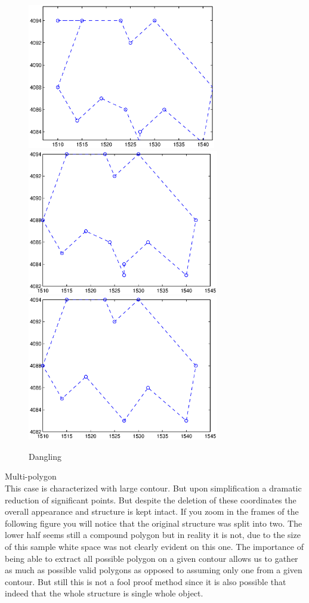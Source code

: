 \documentclass{sig-alternate}
\begin{document}
\begin{figure}
 \includegraphics[height=2.5in]{dangle_orig.eps}
 \includegraphics[height=2.5in]{dangle_dist0.eps}
 \includegraphics[height=2.5in]{dangle_dist2.eps}
 \caption{Dangling}

 \label{fig:Dangling}
\end{figure}

Multi-polygon \\

This case is characterized with large contour. But upon simplification a dramatic reduction of significant points. But despite the deletion of these coordinates the overall appearance and structure is kept intact. 
If you zoom in the frames of the following figure you will notice that the original structure was split into two. The lower half seems still a compound polygon but in reality it is not, due to the size of this sample white space was not clearly evident on this one.
The importance of being able to extract all possible polygon on a given contour allows us to gather as much as possible valid polygons as opposed to assuming only one from a given contour. But still this is not a fool proof method since it is also possible that indeed that the whole structure is single whole object.\\  
\end{document}
